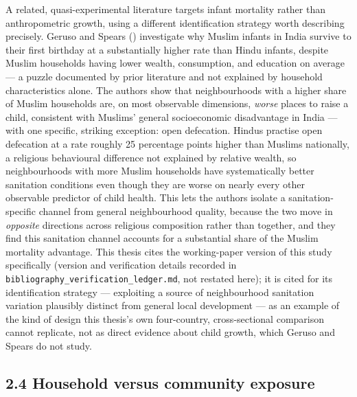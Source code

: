 A related, quasi-experimental literature targets infant mortality rather than anthropometric growth, using a different identification strategy worth describing precisely. Geruso and Spears (\citeyear{GerusoSpears2015}) investigate why Muslim infants in India survive to their first birthday at a substantially higher rate than Hindu infants, despite Muslim households having lower wealth, consumption, and education on average --- a puzzle documented by prior literature and not explained by household characteristics alone. The authors show that neighbourhoods with a higher share of Muslim households are, on most observable dimensions, \textit{worse} places to raise a child, consistent with Muslims' general socioeconomic disadvantage in India --- with one specific, striking exception: open defecation. Hindus practise open defecation at a rate roughly 25 percentage points higher than Muslims nationally, a religious behavioural difference not explained by relative wealth, so neighbourhoods with more Muslim households have systematically better sanitation conditions even though they are worse on nearly every other observable predictor of child health. This lets the authors isolate a sanitation-specific channel from general neighbourhood quality, because the two move in \textit{opposite} directions across religious composition rather than together, and they find this sanitation channel accounts for a substantial share of the Muslim mortality advantage. This thesis cites the working-paper version of this study specifically (version and verification details recorded in \texttt{bibliography\_verification\_ledger.md}, not restated here); it is cited for its identification strategy --- exploiting a source of neighbourhood sanitation variation plausibly distinct from general local development --- as an example of the kind of design this thesis's own four-country, cross-sectional comparison cannot replicate, not as direct evidence about child growth, which Geruso and Spears do not study.

\subsection*{2.4 Household versus community exposure}

